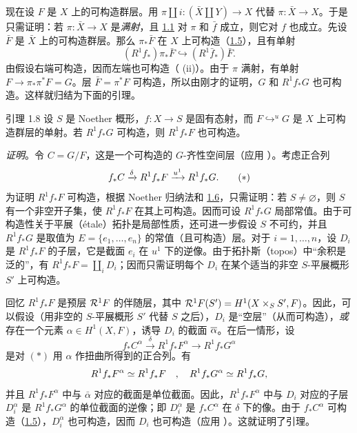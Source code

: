 现在设 $F$ 是 $X$ 上的可构造群层。用 $\pi\amalg i:(\bar X\amalg Y)\rightarrow X$ 代替 $\pi:\bar X\rightarrow X$。于是只需证明：若 $\pi:\bar X\rightarrow X$ 是\emph{满射}，且 \hyperref[XIV.thm1.1]{1.1} 对 $\pi$ 和 $\bar f$ 成立，则它对 $f$ 也成立。先设 $\bar F$ 是 $\bar X$ 上的可构造群层。那么 $\pi_*\bar F$ 在 $X$ 上可构造（\hyperref[XIV.lem1.5]{1.5}），且有单射
$$
(R^1f_*)\pi_*\bar F\hookrightarrow(R^1\bar f_*)\bar F.
$$
由假设右端可构造，因而左端也可构造（ (ii)）。由于 $\pi$ 满射，有单射 $F\rightarrow\pi_*\pi^*F=G$。层 $\bar F=\pi^*F$ 可构造，所以由刚才的证明，$G$ 和 $R^1f_*G$ 也可构造。这样就归结为下面的引理。

\begin{enonce*}{引理 1.8}
设 $S$ 是 Noether 概形，$f:X\rightarrow S$ 是固有态射，而 $\displaystyle F\mathop{\hookrightarrow}^{u}G$ 是 $X$ 上可构造群层的单射。若 $R^1f_*G$ 可构造，则 $R^1f_*F$ 也可构造。
\end{enonce*}

\noindent
\emph{证明}。令 $C=G/F$，这是一个可构造的 $G$-齐性空间层（应用 ）。考虑正合列
\begin{equation*}
f_*C\xrightarrow{\delta}R^1f_*F\xrightarrow{u^1}R^1f_*G{}.
\tag{$*$}
\end{equation*}
为证明 $R^1f_*F$ 可构造，根据 Noether 归纳法和 \hyperref[XIV.lem1.6]{1.6}，只需证明：若 $S\neq\varnothing$，则 $S$ 有一个非空开子集，使 $R^1f_*F$ 在其上可构造。因而可设 $R^1f_*G$ 局部常值。由于可构造性关于平展（étale）拓扑是局部性质，还可进一步假设 $S$ 不可约，并且 $R^1f_*G$ 是取值为 $E=\{e_1,\ldots,e_n\}$ 的常值（且可构造）层。对于 $i=1,\ldots,n$，设 $D_i$ 是 $R^1f_*F$ 的子层\pageoriginale，它是截面 $e_i$ 在 $u^1$ 下的逆像。由于拓扑斯（topos）中“余积是泛的”，有 $R^1f_*F=\amalg_iD_i$；因而只需证明每个 $D_i$ 在某个适当的非空 $S$-平展概形 $S'$ 上可构造。

回忆 $R^1f_*F$ 是预层 ${\mathcal R}^1F$ 的伴随层，其中 ${\mathcal R}^1F(S')=H^1(X\times_SS',F)$。因此，可以假设（用非空的 $S$-平展概形 $S'$ 代替 $S$ 之后），$D_i$ 是“空层”（从而可构造），\emph{或}存在一个元素 $\alpha\in H^{1}(X,F)$，诱导 $D_i$ 的截面 $\overline{\alpha}$。在后一情形，设
$$
f_{\ast}C^{\alpha}\xrightarrow{\delta}R^{1}f_{\ast}F^{\alpha}\longrightarrow
R^{1}f_{\ast}G^{\alpha}
$$
是对 $(\ast)$ 用 $\alpha$ 作扭曲所得到的正合列。有
$$
R^{1}f_{\ast}F^{\alpha}\simeq R^{1}f_{\ast}F\quad,\quad
R^{1}f_{\ast}G^{\alpha}\simeq R^{1}f_{\ast}G{},
$$
并且 $R^{1}f_{\ast}F^{\alpha}$ 中与 $\bar{\alpha}$ 对应的截面是单位截面。因此，$R^{1}f_{\ast}F^{\alpha}$ 中与 $D_i$ 对应的子层 $D_i^{\alpha}$ 是 $R^{1}f_{\ast}G^{\alpha}$ 的单位截面的逆像；即 $D_i^{\alpha}$ 是 $f_{\ast}C^{\alpha}$ 在 $\delta$ 下的像。由于 $f_{\ast}C^{\alpha}$ 可构造（\hyperref[XIV.lem1.5]{1.5}），$D_i^{\alpha}$ 也可构造，因而 $D_i$ 也可构造（应用 ）。这就证明了引理。


